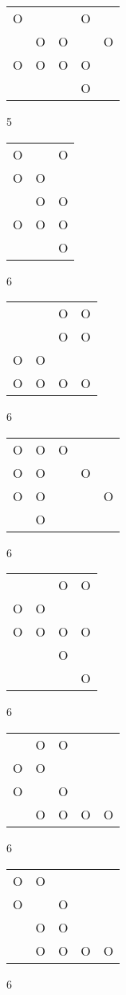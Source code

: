\begin{tabular}{|m{0.2cm}m{0.2cm}m{0.2cm}m{0.2cm}m{0.2cm}|}\hline
O& & &O& \\
 &O&O& &O\\
O&O&O&O& \\
 & & &O& \\
\hline\end{tabular}5
\begin{tabular}{|m{0.2cm}m{0.2cm}m{0.2cm}|}\hline
O& &O\\
O&O& \\
 &O&O\\
O&O&O\\
 & &O\\
\hline\end{tabular}6
\begin{tabular}{|m{0.2cm}m{0.2cm}m{0.2cm}m{0.2cm}|}\hline
 & &O&O\\
 & &O&O\\
O&O& & \\
O&O&O&O\\
\hline\end{tabular}6
\begin{tabular}{|m{0.2cm}m{0.2cm}m{0.2cm}m{0.2cm}m{0.2cm}|}\hline
O&O&O& & \\
O&O& &O& \\
O&O& & &O\\
 &O& & & \\
\hline\end{tabular}6
\begin{tabular}{|m{0.2cm}m{0.2cm}m{0.2cm}m{0.2cm}|}\hline
 & &O&O\\
O&O& & \\
O&O&O&O\\
 & &O& \\
 & & &O\\
\hline\end{tabular}6
\begin{tabular}{|m{0.2cm}m{0.2cm}m{0.2cm}m{0.2cm}m{0.2cm}|}\hline
 &O&O& & \\
O&O& & & \\
O& &O& & \\
 &O&O&O&O\\
\hline\end{tabular}6
\begin{tabular}{|m{0.2cm}m{0.2cm}m{0.2cm}m{0.2cm}m{0.2cm}|}\hline
O&O& & & \\
O& &O& & \\
 &O&O& & \\
 &O&O&O&O\\
\hline\end{tabular}6
